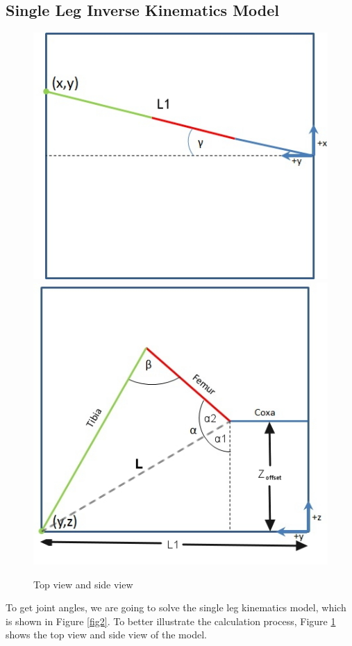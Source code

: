 \documentclass[conference]{IEEEtran}
\begin{document}
\subsection{Single Leg Inverse Kinematics Model}

\begin{figure}
    \centering
    \includegraphics[scale=0.36,align=t]{1-IK-top.jpg}
    \includegraphics[scale=0.35,align=t]{2-IK-side1.jpg}
    \caption{Top view and side view}
    \label{fig3}
\end{figure}

 To get joint angles, we are going to solve the single leg kinematics model, which is shown in Figure \ref{fig2}. To better illustrate the calculation process, Figure \ref{fig3} shows the top view and side view of the model.
\end{document}

